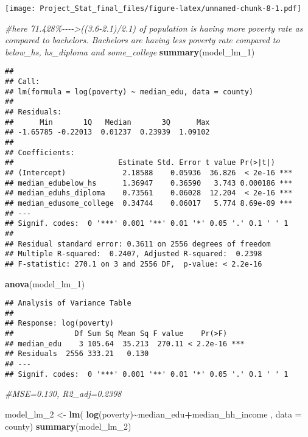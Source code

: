 \documentclass[
]{article}
\newenvironment{Shaded}{\begin{snugshade}}{\end{snugshade}}
\newcommand{\AttributeTok}[1]{\textcolor[rgb]{0.13,0.29,0.53}{#1}}
\newcommand{\CommentTok}[1]{\textcolor[rgb]{0.56,0.35,0.01}{\textit{#1}}}
\newcommand{\FunctionTok}[1]{\textcolor[rgb]{0.13,0.29,0.53}{\textbf{#1}}}
\newcommand{\NormalTok}[1]{#1}
\newcommand{\OtherTok}[1]{\textcolor[rgb]{0.56,0.35,0.01}{#1}}
\newcommand{\SpecialCharTok}[1]{\textcolor[rgb]{0.81,0.36,0.00}{\textbf{#1}}}
\begin{document}
\texttt{[image: Project\_Stat\_final\_files/figure-latex/unnamed-chunk-8-1.pdf]}

\begin{Shaded}
\begin{Highlighting}[]
\CommentTok{\#here 71.428\%{-}{-}{-}{-}\textgreater{}((3.6{-}2.1)/2.1) of population is having more poverty rate as compared to bachelors. Bachelors are having less poverty rate compared to below\_hs, hs\_diploma and some\_college}
\FunctionTok{summary}\NormalTok{(model\_lm\_1)}
\end{Highlighting}
\end{Shaded}

\begin{verbatim}
## 
## Call:
## lm(formula = log(poverty) ~ median_edu, data = county)
## 
## Residuals:
##      Min       1Q   Median       3Q      Max 
## -1.65785 -0.22013  0.01237  0.23939  1.09102 
## 
## Coefficients:
##                        Estimate Std. Error t value Pr(>|t|)    
## (Intercept)             2.18588    0.05936  36.826  < 2e-16 ***
## median_edubelow_hs      1.36947    0.36590   3.743 0.000186 ***
## median_eduhs_diploma    0.73561    0.06028  12.204  < 2e-16 ***
## median_edusome_college  0.34744    0.06017   5.774 8.69e-09 ***
## ---
## Signif. codes:  0 '***' 0.001 '**' 0.01 '*' 0.05 '.' 0.1 ' ' 1
## 
## Residual standard error: 0.3611 on 2556 degrees of freedom
## Multiple R-squared:  0.2407, Adjusted R-squared:  0.2398 
## F-statistic: 270.1 on 3 and 2556 DF,  p-value: < 2.2e-16
\end{verbatim}

\begin{Shaded}
\begin{Highlighting}[]
\FunctionTok{anova}\NormalTok{(model\_lm\_1)}
\end{Highlighting}
\end{Shaded}

\begin{verbatim}
## Analysis of Variance Table
## 
## Response: log(poverty)
##              Df Sum Sq Mean Sq F value    Pr(>F)    
## median_edu    3 105.64  35.213  270.11 < 2.2e-16 ***
## Residuals  2556 333.21   0.130                      
## ---
## Signif. codes:  0 '***' 0.001 '**' 0.01 '*' 0.05 '.' 0.1 ' ' 1
\end{verbatim}

\begin{Shaded}
\begin{Highlighting}[]
\CommentTok{\#MSE=0.130, R2\_adj=0.2398}

\NormalTok{model\_lm\_2 }\OtherTok{\textless{}{-}} \FunctionTok{lm}\NormalTok{( }\FunctionTok{log}\NormalTok{(poverty)}\SpecialCharTok{\textasciitilde{}}\NormalTok{median\_edu}\SpecialCharTok{+}\NormalTok{median\_hh\_income , }\AttributeTok{data =}\NormalTok{ county)}
\FunctionTok{summary}\NormalTok{(model\_lm\_2)}
\end{Highlighting}
\end{Shaded}
\end{document}
